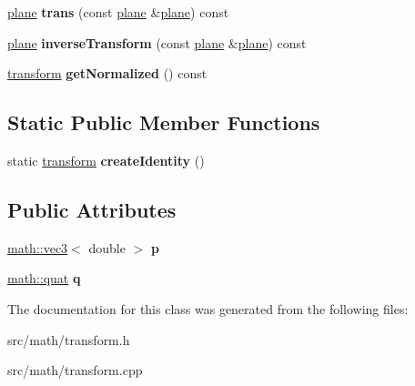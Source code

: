 \begin{DoxyCompactItemize}
\item 
\hypertarget{classmath_1_1transform_afe7b2cc81bb9b5fe0e8ab50070eeb71d}{
\hyperlink{classmath_1_1plane}{plane} {\bfseries trans} (const \hyperlink{classmath_1_1plane}{plane} \&\hyperlink{classmath_1_1plane}{plane}) const }
\label{classmath_1_1transform_afe7b2cc81bb9b5fe0e8ab50070eeb71d}

\item 
\hypertarget{classmath_1_1transform_a09630c9f2f105aa4f762034ebe1e4d10}{
\hyperlink{classmath_1_1plane}{plane} {\bfseries inverseTransform} (const \hyperlink{classmath_1_1plane}{plane} \&\hyperlink{classmath_1_1plane}{plane}) const }
\label{classmath_1_1transform_a09630c9f2f105aa4f762034ebe1e4d10}

\item 
\hypertarget{classmath_1_1transform_aa4bc92a228ef522c23b211ea5000b317}{
\hyperlink{classmath_1_1transform}{transform} {\bfseries getNormalized} () const }
\label{classmath_1_1transform_aa4bc92a228ef522c23b211ea5000b317}

\end{DoxyCompactItemize}
\subsection*{Static Public Member Functions}
\begin{DoxyCompactItemize}
\item 
\hypertarget{classmath_1_1transform_a854c3bb0b7b3956cd685f6787245b684}{
static \hyperlink{classmath_1_1transform}{transform} {\bfseries createIdentity} ()}
\label{classmath_1_1transform_a854c3bb0b7b3956cd685f6787245b684}

\end{DoxyCompactItemize}
\subsection*{Public Attributes}
\begin{DoxyCompactItemize}
\item 
\hypertarget{classmath_1_1transform_a54617e2a2eee98c3549c1e4397f97ebd}{
\hyperlink{classmath_1_1vec3}{math::vec3}$<$ double $>$ {\bfseries p}}
\label{classmath_1_1transform_a54617e2a2eee98c3549c1e4397f97ebd}

\item 
\hypertarget{classmath_1_1transform_a26d96e14686f6a03e820a8485fc1cec6}{
\hyperlink{classmath_1_1quat}{math::quat} {\bfseries q}}
\label{classmath_1_1transform_a26d96e14686f6a03e820a8485fc1cec6}

\end{DoxyCompactItemize}


The documentation for this class was generated from the following files:\begin{DoxyCompactItemize}
\item 
src/math/transform.h\item 
src/math/transform.cpp\end{DoxyCompactItemize}
